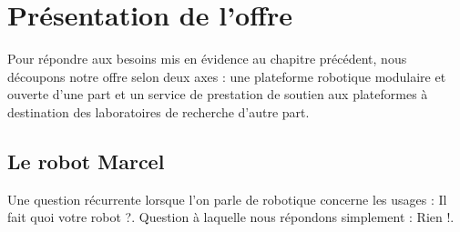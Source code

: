 \documentclass[a4paper,12pt]{report}
\begin{document}
\section{Présentation de l'offre}

Pour répondre aux besoins mis en évidence au chapitre précédent, nous découpons notre offre selon deux axes :
une plateforme robotique modulaire et ouverte d'une part et un service de prestation de soutien aux plateformes à destination des laboratoires de recherche d'autre part.
\subsection{Le robot Marcel}
Une question récurrente lorsque l'on parle de robotique concerne les usages : \og{}Il fait quoi votre robot ?\fg{}.
Question à laquelle nous répondons simplement : \og{}Rien !\fg{}.
\end{document}
